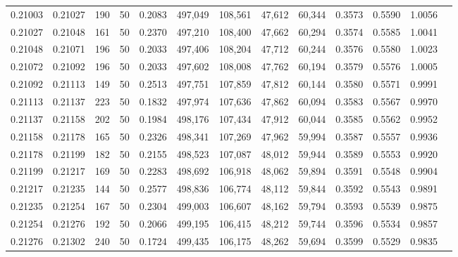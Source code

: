 \begin{tabular}{rrrrrrrrrrrrr}
0.21003 & 0.21027 &   190 &  50 &                                     0.2083 & 497,049 & 108,561 &  47,612 &  60,344 & 0.3573 & 0.5590 & 1.0056 \\
0.21027 & 0.21048 &   161 &  50 &                                     0.2370 & 497,210 & 108,400 &  47,662 &  60,294 & 0.3574 & 0.5585 & 1.0041 \\
0.21048 & 0.21071 &   196 &  50 &                                     0.2033 & 497,406 & 108,204 &  47,712 &  60,244 & 0.3576 & 0.5580 & 1.0023 \\
0.21072 & 0.21092 &   196 &  50 &                                     0.2033 & 497,602 & 108,008 &  47,762 &  60,194 & 0.3579 & 0.5576 & 1.0005 \\
0.21092 & 0.21113 &   149 &  50 &                                     0.2513 & 497,751 & 107,859 &  47,812 &  60,144 & 0.3580 & 0.5571 & 0.9991 \\
0.21113 & 0.21137 &   223 &  50 &                                     0.1832 & 497,974 & 107,636 &  47,862 &  60,094 & 0.3583 & 0.5567 & 0.9970 \\
0.21137 & 0.21158 &   202 &  50 &                                     0.1984 & 498,176 & 107,434 &  47,912 &  60,044 & 0.3585 & 0.5562 & 0.9952 \\
0.21158 & 0.21178 &   165 &  50 &                                     0.2326 & 498,341 & 107,269 &  47,962 &  59,994 & 0.3587 & 0.5557 & 0.9936 \\
0.21178 & 0.21199 &   182 &  50 &                                     0.2155 & 498,523 & 107,087 &  48,012 &  59,944 & 0.3589 & 0.5553 & 0.9920 \\
0.21199 & 0.21217 &   169 &  50 &                                     0.2283 & 498,692 & 106,918 &  48,062 &  59,894 & 0.3591 & 0.5548 & 0.9904 \\
0.21217 & 0.21235 &   144 &  50 &                                     0.2577 & 498,836 & 106,774 &  48,112 &  59,844 & 0.3592 & 0.5543 & 0.9891 \\
0.21235 & 0.21254 &   167 &  50 &                                     0.2304 & 499,003 & 106,607 &  48,162 &  59,794 & 0.3593 & 0.5539 & 0.9875 \\
0.21254 & 0.21276 &   192 &  50 &                                     0.2066 & 499,195 & 106,415 &  48,212 &  59,744 & 0.3596 & 0.5534 & 0.9857 \\
0.21276 & 0.21302 &   240 &  50 &                                     0.1724 & 499,435 & 106,175 &  48,262 &  59,694 & 0.3599 & 0.5529 & 0.9835 \\

\end{tabular}

